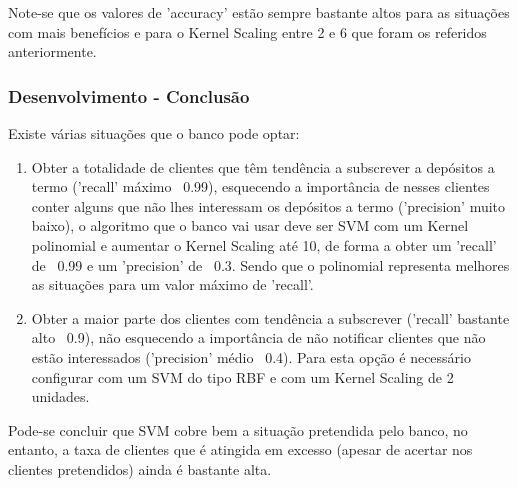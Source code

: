 \documentclass[portugues,final]{revdetua}
\begin{document}
Note-se que os valores de 'accuracy' estão sempre bastante altos para as situações com mais benefícios e para o Kernel Scaling entre 2 e 6 que foram os referidos anteriormente.

\subsubsection{Desenvolvimento - Conclusão}

Existe várias situações que o banco pode optar:
\begin{enumerate}
\item Obter a totalidade de clientes que têm tendência a subscrever a depósitos a termo ('recall' máximo ~0.99), esquecendo a importância de nesses clientes conter alguns que não lhes interessam os depósitos a termo ('precision' muito baixo), o algoritmo que o banco vai usar deve ser SVM com um Kernel polinomial e aumentar o Kernel Scaling até 10, de forma a obter um 'recall' de ~0.99 e um 'precision' de ~0.3. Sendo que o polinomial representa melhores as situações para um valor máximo de 'recall'.
\item Obter a maior parte dos clientes com tendência a subscrever ('recall' bastante alto ~0.9), não esquecendo a importância de não notificar clientes que não estão interessados ('precision' médio ~0.4). Para esta opção é necessário configurar com um SVM do tipo RBF e com um Kernel Scaling de 2 unidades.
\end{enumerate}

Pode-se concluir que SVM cobre bem a situação pretendida pelo banco, no entanto, a taxa de clientes que é atingida em excesso (apesar de acertar nos clientes pretendidos) ainda é bastante alta.

\end{document}
